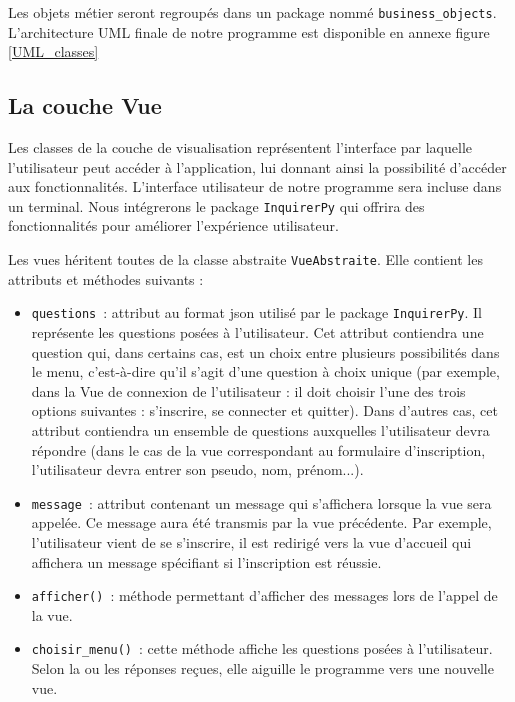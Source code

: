 \documentclass[11pt]{article}
\begin{document}
\bigbreak

Les objets métier seront regroupés dans un package nommé \texttt{business\_objects}. L'architecture UML finale de notre programme est disponible en annexe figure \ref{UML_classes}



\subsection{La couche Vue}

Les classes de la couche de visualisation représentent l'interface par laquelle l'utilisateur peut accéder à l'application, lui donnant ainsi la possibilité d'accéder aux fonctionnalités. L'interface utilisateur de notre programme sera incluse dans un terminal. Nous intégrerons le package \texttt{InquirerPy} qui offrira des fonctionnalités pour améliorer l'expérience utilisateur.
\bigbreak

Les vues héritent toutes de la classe abstraite \texttt{VueAbstraite}. Elle contient les attributs et méthodes suivants :
\begin{itemize}
    \item \texttt{questions}~: attribut au format json utilisé par le package \texttt{InquirerPy}. Il représente les questions posées à l'utilisateur. Cet attribut contiendra une question qui, dans certains cas, est un choix entre plusieurs possibilités dans le menu, c'est-à-dire qu'il s'agit d'une question à choix unique (par exemple, dans la Vue de connexion de l'utilisateur : il doit choisir l'une des trois options suivantes : s'inscrire, se connecter et quitter). Dans d'autres cas, cet attribut contiendra un ensemble de questions auxquelles l'utilisateur devra répondre (dans le cas de la vue correspondant au formulaire d'inscription, l'utilisateur devra entrer son pseudo, nom, prénom...).
    \item \texttt{message}~: attribut contenant un message qui s'affichera lorsque la vue sera appelée. Ce message aura été transmis par la vue précédente. Par exemple, l'utilisateur vient de se s'inscrire, il est redirigé vers la vue d'accueil qui affichera un message spécifiant si l'inscription est réussie.
    \item \texttt{afficher()}~: méthode permettant d'afficher des messages lors de l'appel de la vue.
    \item \texttt{choisir\_menu()}~: cette méthode affiche les questions posées à l'utilisateur. Selon la ou les réponses reçues, elle aiguille le programme vers une nouvelle vue.
\end{itemize}
\end{document}
